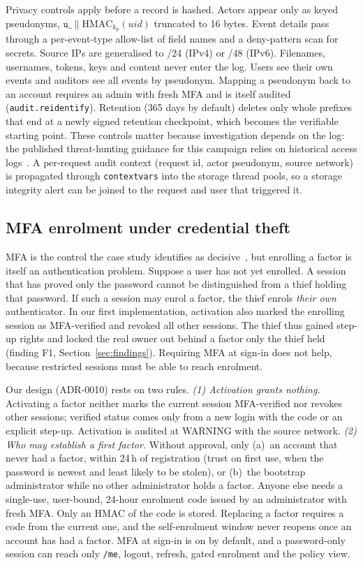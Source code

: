 \documentclass[conference]{IEEEtran}
\newcommand{\code}[1]{\texttt{\small #1}}
\begin{document}
Privacy controls apply before a record is hashed. Actors appear only as keyed pseudonyms, $\texttt{u\_}\|\mathrm{HMAC}_{k_p}(\mathit{uid})$ truncated to 16 bytes. Event details pass through a per-event-type allow-list of field names and a deny-pattern scan for secrets. Source IPs are generalised to /24 (IPv4) or /48 (IPv6). Filenames, usernames, tokens, keys and content never enter the log. Users see their own events and auditors see all events by pseudonym. Mapping a pseudonym back to an account requires an admin with fresh MFA and is itself audited (\code{audit.reidentify}). Retention (365 days by default) deletes only whole prefixes that end at a newly signed retention checkpoint, which becomes the verifiable starting point. These controls matter because investigation depends on the log: the published threat-hunting guidance for this campaign relies on historical access logs~\cite{mandiant2024hunting}. A per-request audit context (request id, actor pseudonym, source network) is propagated through \code{contextvars} into the storage thread pools, so a storage integrity alert can be joined to the request and user that triggered it.

\subsection{MFA enrolment under credential theft}\label{sec:tofu}
MFA is the control the case study identifies as decisive~\cite{casestudy2026}, but enrolling a factor is itself an authentication problem. Suppose a user has not yet enrolled. A session that has proved only the password cannot be distinguished from a thief holding that password. If such a session may enrol a factor, the thief enrols \emph{their own} authenticator. In our first implementation, activation also marked the enrolling session as MFA-verified and revoked all other sessions. The thief thus gained step-up rights and locked the real owner out behind a factor only the thief held (finding F1, Section~\ref{sec:findings}). Requiring MFA at sign-in does not help, because restricted sessions must be able to reach enrolment.

Our design (ADR-0010) rests on two rules. \emph{(1) Activation grants nothing.} Activating a factor neither marks the current session MFA-verified nor revokes other sessions; verified status comes only from a new login with the code or an explicit step-up. Activation is audited at WARNING with the source network. \emph{(2) Who may establish a first factor.} Without approval, only (a)~an account that never had a factor, within 24\,h of registration (trust on first use, when the password is newest and least likely to be stolen), or (b)~the bootstrap administrator while no other administrator holds a factor. Anyone else needs a single-use, user-bound, 24-hour enrolment code issued by an administrator with fresh MFA. Only an HMAC of the code is stored. Replacing a factor requires a code from the current one, and the self-enrolment window never reopens once an account has had a factor. MFA at sign-in is on by default, and a password-only session can reach only \code{/me}, logout, refresh, gated enrolment and the policy view.
\end{document}
